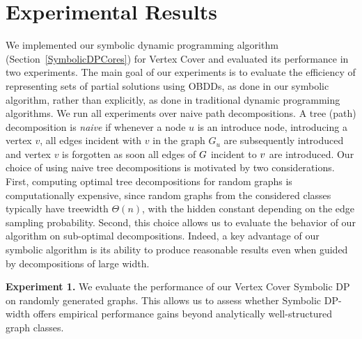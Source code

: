 
\section{Experimental Results}\label{sec:Experiments}

We implemented our symbolic dynamic programming algorithm
(Section~\ref{SymbolicDPCores}) for {\sc Vertex Cover} and evaluated its
performance in two experiments. The main goal of our experiments is to evaluate the efficiency of representing sets of partial solutions using OBDDs, as done in our symbolic algorithm, rather than explicitly, as done in traditional dynamic programming algorithms. %
We run all experiments over naive path decompositions.
A tree (path) decomposition is \emph{naive} if whenever a node $u$ is an introduce node, introducing a vertex $v$, all edges incident with $v$ in the graph $G_u$ are subsequently introduced and vertex $v$ is forgotten as soon all edges of $G$ incident to $v$ are introduced. Our choice of using naive tree decompositions is motivated by two
considerations. First, computing optimal tree decompositions for random graphs
is computationally expensive, since random graphs from the considered classes
typically have treewidth $\Theta(n)$, with the hidden constant depending on the
edge sampling probability. Second, this choice allows us to evaluate the
behavior of our algorithm on sub-optimal decompositions. Indeed, a key advantage
of our symbolic algorithm is its ability to produce reasonable results even when
guided by decompositions of large width.

\textbf{Experiment 1.}
We evaluate the performance of our {\sc Vertex Cover} Symbolic DP on randomly generated
graphs. 
This allows us to assess whether Symbolic DP-width offers empirical
performance gains beyond analytically well-structured graph classes.


